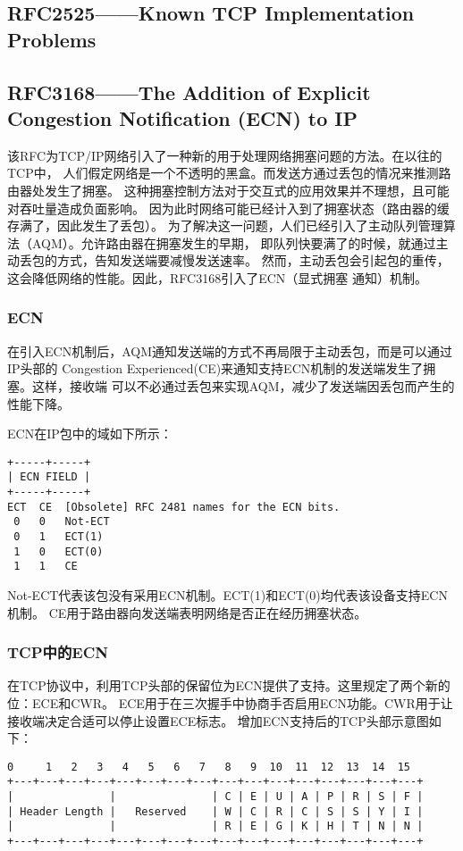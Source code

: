 	\subsection{RFC2525——Known TCP Implementation Problems}
	\label{subsec:rfc2525}
		
\subsection{RFC3168——The Addition of Explicit Congestion Notification (ECN) to IP}
\label{subsec:rfc3168}
该RFC为TCP/IP网络引入了一种新的用于处理网络拥塞问题的方法。在以往的TCP中，
人们假定网络是一个不透明的黑盒。而发送方通过丢包的情况来推测路由器处发生了拥塞。
这种拥塞控制方法对于交互式的应用效果并不理想，且可能对吞吐量造成负面影响。
因为此时网络可能已经计入到了拥塞状态（路由器的缓存满了，因此发生了丢包）。
为了解决这一问题，人们已经引入了主动队列管理算法（AQM）。允许路由器在拥塞发生的早期，
即队列快要满了的时候，就通过主动丢包的方式，告知发送端要减慢发送速率。
然而，主动丢包会引起包的重传，这会降低网络的性能。因此，RFC3168引入了ECN（显式拥塞
通知）机制。

\subsubsection{ECN}
\label{subsubsec:ecn}
在引入ECN机制后，AQM通知发送端的方式不再局限于主动丢包，而是可以通过IP头部的
Congestion Experienced(CE)来通知支持ECN机制的发送端发生了拥塞。这样，接收端
可以不必通过丢包来实现AQM，减少了发送端因丢包而产生的性能下降。

ECN在IP包中的域如下所示：
\begin{verbatim}
+-----+-----+ 
| ECN FIELD | 
+-----+-----+ 
ECT  CE  [Obsolete] RFC 2481 names for the ECN bits. 
 0   0   Not-ECT 
 0   1   ECT(1) 
 1   0   ECT(0) 
 1   1   CE
\end{verbatim}

Not-ECT代表该包没有采用ECN机制。ECT(1)和ECT(0)均代表该设备支持ECN机制。
CE用于路由器向发送端表明网络是否正在经历拥塞状态。

\subsubsection{TCP中的ECN}
在TCP协议中，利用TCP头部的保留位为ECN提供了支持。这里规定了两个新的位：ECE和CWR。
ECE用于在三次握手中协商手否启用ECN功能。CWR用于让接收端决定合适可以停止设置ECE标志。
增加ECN支持后的TCP头部示意图如下：
\begin{verbatim}
0     1   2   3   4   5   6   7   8   9  10  11  12  13  14  15 
+---+---+---+---+---+---+---+---+---+---+---+---+---+---+---+---+ 
|               |               | C | E | U | A | P | R | S | F | 
| Header Length |   Reserved    | W | C | R | C | S | S | Y | I | 
|               |               | R | E | G | K | H | T | N | N | 
+---+---+---+---+---+---+---+---+---+---+---+---+---+---+---+---+
\end{verbatim}

